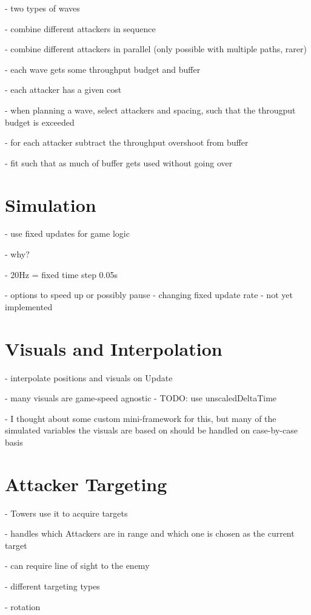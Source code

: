 - two types of waves

- combine different attackers in sequence

- combine different attackers in parallel (only possible with multiple paths, rarer)

- each wave gets some throughput budget and buffer

- each attacker has a given cost

- when planning a wave, select attackers and spacing, such that the througput budget is exceeded

- for each attacker subtract the throughput overshoot from buffer

- fit such that as much of buffer gets used without going over

\section{Simulation}

- use fixed updates for game logic

- why?

- 20Hz = fixed time step 0.05s

- options to speed up or possibly pause - changing fixed update rate - not yet implemented

\section{Visuals and Interpolation}

- interpolate positions and visuals on Update

- many visuals are game-speed agnostic     - TODO: use unscaledDeltaTime

- I thought about some custom mini-framework for this, but many of the simulated variables the visuals are based on should be handled on case-by-case basis

\section{Attacker Targeting}

- Towers use it to acquire targets

- handles which Attackers are in range and which one is chosen as the current target

- can require line of sight to the enemy

- different targeting types

- rotation

